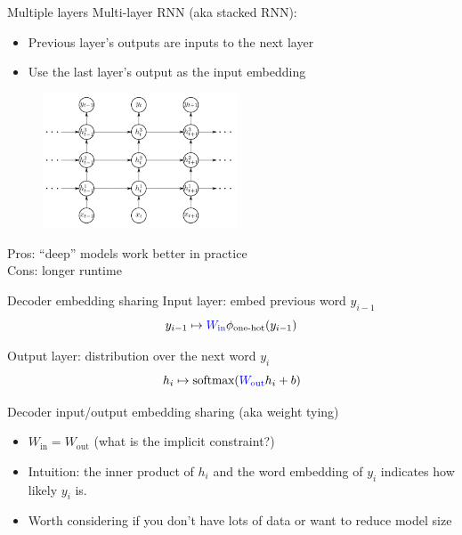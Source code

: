 \documentclass[usenames,dvipsnames,11pt,aspectratio=169]{beamer}
\begin{document}
\begin{frame}
    {Multiple layers}
    Multi-layer RNN (aka stacked RNN):\\
    \begin{itemize}
        \item Previous layer's outputs are inputs to the next layer 
        \item Use the last layer's output as the input embedding
    \end{itemize}
    \vspace{-1em}
    \begin{figure}
        \includegraphics[height=4cm]{figures/stacked-rnn}
    \end{figure}
    \vspace{-1em}
    Pros: ``deep'' models work better in practice\\
    Cons: longer runtime
\end{frame}

\begin{frame}
    {Decoder embedding sharing}
    Input layer: embed previous word $y_{i-1}$
    $$
    y_{i-1} \mapsto {\color{blue}W_{\text{in}}}\phi_{\text{one-hot}}(y_{i-1})
    $$

    Output layer: distribution over the next word $y_i$
    $$
    h_i \mapsto \text{softmax}({\color{blue}W_{\text{out}}}h_i + b)
    $$

    Decoder input/output embedding sharing (aka weight tying)\\
    \begin{itemize}
        \item $W_{\text{in}} = W_{\text{out}}$ (what is the implicit constraint?)
        \item Intuition: the inner product of $h_i$ and the word embedding of $y_i$ indicates how likely $y_i$ is.
        \item Worth considering if you don't have lots of data or want to reduce model size 
    \end{itemize}
\end{frame}
\end{document}
